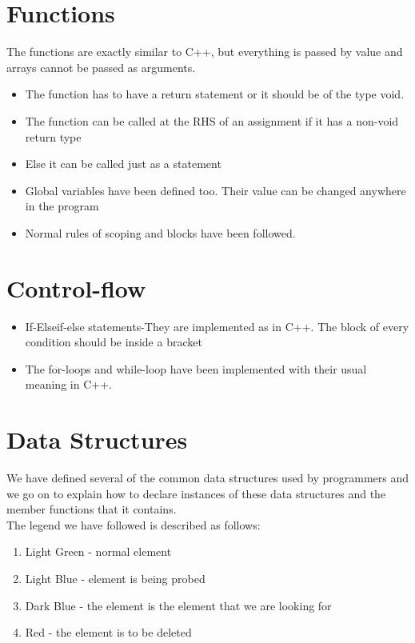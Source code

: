 \documentclass[12pt]{article}
\begin{document}
\section{Functions}
The functions are exactly similar to C++, but everything is passed by value and arrays cannot be passed as arguments.
\begin{itemize}
\item The function has to have a return statement or it should be of the type void.
\item The function can be called at the RHS of an assignment if it has a non-void return type
\item Else it can be called just as a statement
\item Global variables have been defined too. Their value can be changed anywhere in the program
\item Normal rules of scoping and blocks have been followed.
\end{itemize}
\section{Control-flow}
\begin{itemize}
\item If-Elseif-else statements-They are implemented as in C++. The block of every condition should be inside a {} bracket
\item The for-loops and while-loop have been implemented with their usual meaning in C++.
\end{itemize}


\section{Data Structures}
We have defined several of the common data structures used by programmers and we go on to explain how to declare instances of these data structures and the member functions that it contains.\\
The legend we have followed is described as follows:
\begin{enumerate}
\item Light Green - normal element
\item Light Blue - element is being probed
\item Dark Blue - the element is the element that we are looking for
\item Red - the element is to be deleted
\end{enumerate}
\end{document}
